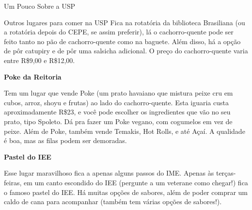 \begin{secao}{Um Pouco Sobre a USP}
\begin{subsecao}{Outros lugares para comer na USP}
Fica na rotatória da biblioteca Brasiliana (ou a rotatória depois do CEPE, se assim preferir),
lá o cachorro-quente pode ser feito tanto no pão de cachorro-quente como na baguete. Além disso,
há a opção de pôr catupiry e de pôr uma salsicha adicional. O preço do cachorro-quente varia
entre R\$9,00 e R\$12,00.

\textbf{Poke da Reitoria}

Tem um lugar que vende Poke (um prato havaiano que mistura peixe cru em cubos,
arroz, shoyu e frutas) ao lado do cachorro-quente. Esta iguaria custa
aproximadamente R\$23, e você pode escolher os ingredientes que vão no seu prato,
tipo Spoleto. Dá pra fazer um Poke vegano, com cogumelos em vez de peixe. Além de
Poke, também vende Temakis, Hot Rolls, e até Açaí. A qualidade é boa, mas as filas
podem ser demoradas.

\textbf{Pastel do IEE}

Esse lugar maravilhoso fica a apenas alguns passos do IME. Apenas às terças-feiras,
em um canto escondido do IEE (pergunte a um veterane como chegar!) fica o famoso pastel do IEE.
Há muitas opções de sabores, além de poder comprar um caldo de cana para acompanhar (também tem várias opções de sabores!).

\end{subsecao}

\end{secao}
